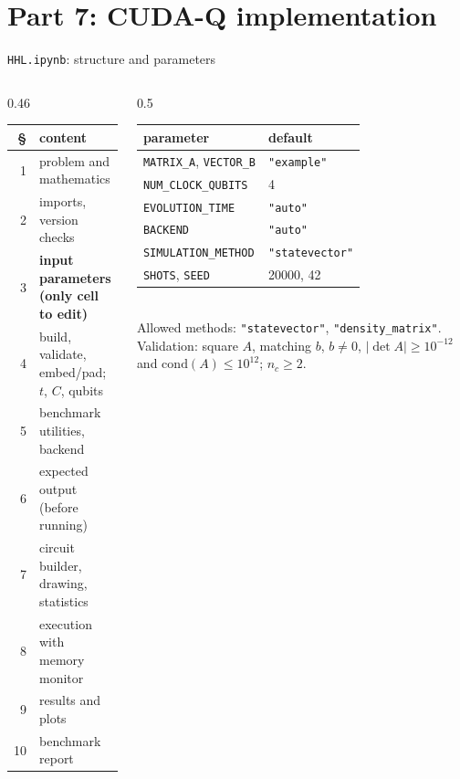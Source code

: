 \documentclass[aspectratio=169,11pt]{beamer}
\begin{document}
\section{Part 7: CUDA-Q implementation}
\begin{frame}{\texttt{HHL.ipynb}: structure and parameters}
  \begin{columns}[T]
    \begin{column}{0.46\textwidth}
      \scriptsize
      \begin{tabular}{rl}
        \toprule \S & content\\ \midrule
        1 & problem and mathematics\\ 2 & imports, version checks\\ 3 & \textbf{input parameters (only cell to edit)}\\
        4 & build, validate, embed/pad; $t$, $C$, qubits\\ 5 & benchmark utilities, backend\\ 6 & expected output (before running)\\
        7 & circuit builder, drawing, statistics\\ 8 & execution with memory monitor\\ 9 & results and plots\\ 10 & benchmark report\\ \bottomrule
      \end{tabular}
    \end{column}
    \begin{column}{0.5\textwidth}
      \scriptsize
      \begin{tabular}{ll}
        \toprule parameter & default\\ \midrule
        \texttt{MATRIX\_A}, \texttt{VECTOR\_B} & \texttt{"example"}\\
        \texttt{NUM\_CLOCK\_QUBITS} & 4\\
        \texttt{EVOLUTION\_TIME} & \texttt{"auto"}\\
        \texttt{BACKEND} & \texttt{"auto"}\\
        \texttt{SIMULATION\_METHOD} & \texttt{"statevector"}\\
        \texttt{SHOTS}, \texttt{SEED} & 20000, 42\\ \bottomrule
      \end{tabular}\\[2mm]
      Allowed methods: \texttt{"statevector"}, \texttt{"density\_matrix"}.
      Validation: square $A$, matching $b$, $b \ne 0$, $|\det A| \ge 10^{-12}$ and $\mathrm{cond}(A) \le 10^{12}$; $n_c \ge 2$.
    \end{column}
  \end{columns}
\end{frame}
\end{document}
